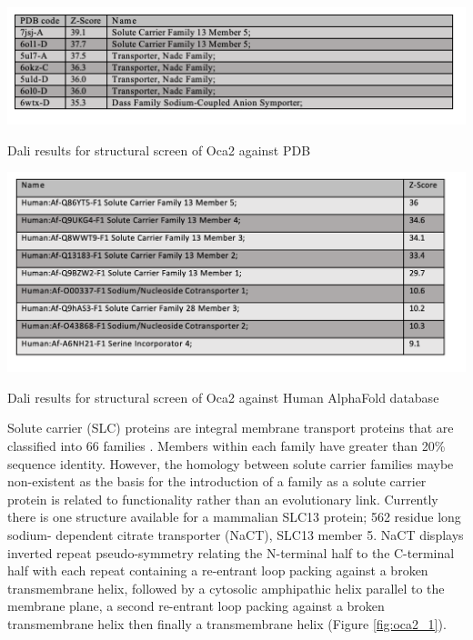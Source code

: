 \begin{table}[th!]
    \centering
    \includegraphics[width=150mm, scale=0.75]{oca2/table_3.png}
    \caption{Dali results for structural screen of Oca2 against PDB}
    \label{table:oca2_dali_pdb}
\small
\end{table}

\begin{table}[th!]
    \centering
    \includegraphics[width=150mm, scale=0.75]{oca2/table_4.png}
    \caption{Dali results for structural screen of Oca2 against Human AlphaFold database}
    \label{table:oca2_dali_af}
\small
\end{table}



Solute carrier (SLC) proteins are integral membrane transport proteins that are classified into 66 families \cite{hediger2004abcs,perland2017classification}. Members within each family have greater than 20\% sequence identity. However, the homology between solute carrier families maybe non-existent \cite{hoglund2011solute} as the basis for the introduction of a family as a solute carrier protein is related to functionality rather than an evolutionary link. Currently there is one structure available for a mammalian SLC13 protein; 562 residue long sodium- dependent citrate transporter (NaCT), SLC13 member 5. NaCT displays inverted repeat pseudo-symmetry relating the N-terminal half to the C-terminal half \cite{sauer2021structure} with each repeat containing a re-entrant loop packing against a broken transmembrane helix, followed by a cytosolic amphipathic helix parallel to the membrane plane, a second re-entrant loop packing against a broken transmembrane helix then finally a transmembrane helix (Figure \ref{fig:oca2_1}). 

